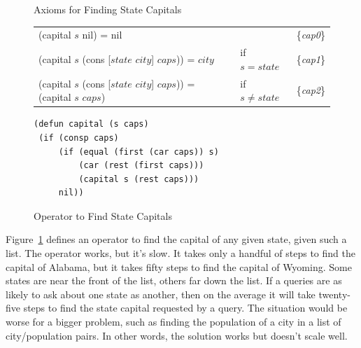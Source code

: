 \begin{figure}
\begin{center}
Axioms for Finding State Capitals
\begin{spacing}{0.9}
\begin{tabular}{lll}
\hline
(capital $s$ nil) = nil                               &             & \{\emph{cap0}\} \\
(capital $s$ (cons [$state$ $city$] $caps$)) = $city$ &if $s=state$ & \{\emph{cap1}\} \\
(capital $s$ (cons [$state$ $city$] $caps$)) = (capital $s$ $caps$) & if $s \neq state$ & \{\emph{cap2}\} \\
\end{tabular}
\end{spacing}
\begin{code}
\begin{verbatim}
(defun capital (s caps)
 (if (consp caps)
     (if (equal (first (car caps)) s)
         (car (rest (first caps)))
         (capital s (rest caps)))
     nil))
\end{verbatim}
\end{code}
\caption{Operator to Find State Capitals}
\label{fig:state-capital-operator}
\end{center}
\end{figure}

Figure~\ref{fig:state-capital-operator}
defines an operator to find the
capital of any given state, given such a list.
The operator works, but it's slow.
It takes only a handful of steps to find the capital of Alabama,
but it takes fifty steps to find the capital of Wyoming.
Some states are near the front of the list,
others far down the list.
If a queries are as likely to ask about
one state as another,
then on the average it will take twenty-five steps to find
the state capital requested by a query.
The situation would be worse for a bigger problem,
such as finding the population of a city in a list of city/population pairs.
In other words, the solution works but doesn't scale well.

